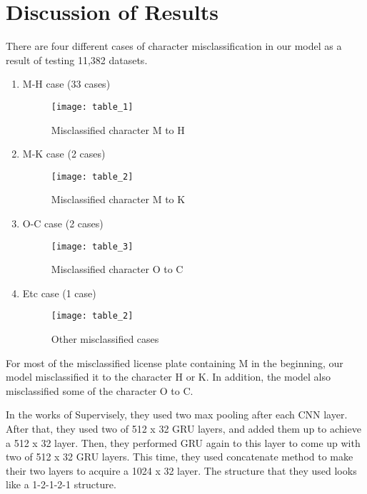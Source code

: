 \documentclass[conference]{IEEEtran}
\begin{document}
\section{Discussion of Results}
There are four different cases of character misclassification in our model as a result of testing 11,382 datasets.
\begin{enumerate}
\item M-H case (33 cases)	\\
\begin{figure}[H]
\centering
\texttt{[image: table\_1]}
\caption{Misclassified character M to H}
\end{figure}

\item M-K case (2 cases)	\\
\begin{figure}[H]
\centering
\texttt{[image: table\_2]}
\caption{Misclassified character M to K}
\end{figure}

\item O-C case (2 cases)	\\
\begin{figure}[H]
\centering
\texttt{[image: table\_3]}
\caption{Misclassified character O to C}
\end{figure}

\item Etc case (1 case)\\
\begin{figure}[H]
\centering
\texttt{[image: table\_2]}
\caption{Other misclassified cases}
\end{figure}

\end{enumerate}
For most of the misclassified license plate containing M in the beginning, our model misclassified it to the character H or K. In addition, the model also misclassified some of the character O to C.

In the works of Supervisely, they used two max pooling after each CNN layer. After that, they used two of 512 x 32 GRU layers, and added them up to achieve a 512 x 32 layer. Then, they performed GRU again to this layer to come up with two of 512 x 32 GRU layers. This time, they used concatenate method to make their two layers to acquire a 1024 x 32 layer. The structure that they used looks like a 1-2-1-2-1 structure.
\end{document}
